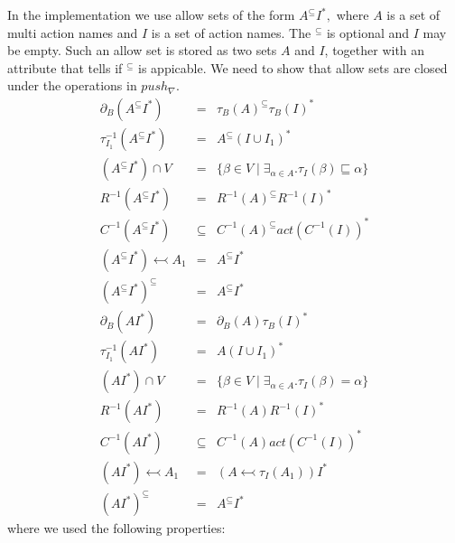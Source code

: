 \documentclass{article}
\begin{document}
In the implementation we use allow sets of the form $A^{\subseteq }I^{\ast },
$ where $A$ is a set of multi action names and $I$ is a set of action names.
The $^{\subseteq }$ is optional and $I$ may be empty. Such an allow set is
stored as two sets $A$ and $I$, together with an attribute that tells if $%
^{\subseteq }$ is appicable. We need to show that allow sets are closed
under the operations in $push_{\nabla }$.%
\[
\begin{array}{lll}
\partial _{B}(A^{\subseteq }I^{\ast }) & = & \tau _{B}(A)^{\subseteq }\tau
_{B}(I)^{\ast } \\ 
\tau _{I_{1}}^{-1}\left( A^{\subseteq }I^{\ast }\right)  & = & A^{\subseteq
}\left( I\cup I_{1}\right) ^{\ast } \\ 
\left( A^{\subseteq }I^{\ast }\right) \cap V & = & \{\beta \in V\mid \exists
_{\alpha \in A}.\tau _{I}(\beta )\sqsubseteq \alpha \} \\ 
R^{-1}\left( A^{\subseteq }I^{\ast }\right)  & = & R^{-1}\left( A\right)
^{\subseteq }R^{-1}\left( I\right) ^{\ast } \\ 
C^{-1}\left( A^{\subseteq }I^{\ast }\right)  & \subseteq  & C^{-1}\left(
A\right) ^{\subseteq }act\left( C^{-1}\left( I\right) \right) ^{\ast } \\ 
\left( A^{\subseteq }I^{\ast }\right) \leftarrowtail A_{1} & = & 
A^{\subseteq }I^{\ast } \\ 
\left( A^{\subseteq }I^{\ast }\right) ^{\subseteq } & = & A^{\subseteq
}I^{\ast } \\ 
\partial _{B}(AI^{\ast }) & = & \partial _{B}(A)\tau _{B}(I)^{\ast } \\ 
\tau _{I_{1}}^{-1}\left( AI^{\ast }\right)  & = & A\left( I\cup I_{1}\right)
^{\ast } \\ 
\left( AI^{\ast }\right) \cap V & = & \{\beta \in V\mid \exists _{\alpha \in
A}.\tau _{I}(\beta )=\alpha \} \\ 
R^{-1}\left( AI^{\ast }\right)  & = & R^{-1}\left( A\right) R^{-1}\left(
I\right) ^{\ast } \\ 
C^{-1}\left( AI^{\ast }\right)  & \subseteq  & C^{-1}\left( A\right)
act\left( C^{-1}\left( I\right) \right) ^{\ast } \\ 
\left( AI^{\ast }\right) \leftarrowtail A_{1} & = & \left( A\leftarrowtail
\tau _{I}(A_{1})\right) I^{\ast } \\ 
\left( AI^{\ast }\right) ^{\subseteq } & = & A^{\subseteq }I^{\ast }%
\end{array}%
\]%
where we used the following properties:%
\end{document}
